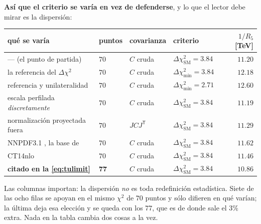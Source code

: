 \documentclass[11pt,a4paper]{article}
\begin{document}
\noindent\textbf{Así que el criterio se varía en vez de defenderse}, y lo que el lector debe mirar
es la dispersión:
\begin{center}\small
{}
\begin{tabular}{llll r}
\toprule
\rowcolor{hdrblue!10}qué se varía & puntos & covarianza & criterio & $1/R_5$ [TeV]\\
\midrule
--- (el punto de partida) & $70$ & $C$ cruda & $\Delta\chi^2_{\mathrm{SM}}=3.84$ & $11.20$\\
la referencia del $\Delta\chi^2$ & $70$ & $C$ cruda & $\Delta\chi^2_{\min}=3.84$ & $12.18$\\
referencia y unilateralidad & $70$ & $C$ cruda & $\Delta\chi^2_{\min}=2.71$ & $12.60$\\
escala perfilada \emph{discretamente} & $70$ & $C$ cruda & $\Delta\chi^2_{\mathrm{SM}}=3.84$ & $11.19$\\
normalización proyectada fuera & $70$ & $JCJ^{\mathsf T}$ & $\Delta\chi^2_{\mathrm{SM}}=3.84$ & $11.29$\\
NNPDF3.1 \cite{NNPDF31}, la base de \cite{CMSangular} & $70$ & $C$ cruda & $\Delta\chi^2_{\mathrm{SM}}=3.84$ & $11.62$\\
CT14nlo \cite{CT14} & $70$ & $C$ cruda & $\Delta\chi^2_{\mathrm{SM}}=3.84$ & $11.46$\\
\midrule
\textbf{citado en la \eqref{eq:tulimit}} & $\mathbf{77}$ & $C$ cruda & $\Delta\chi^2_{\mathrm{SM}}=3.84$ & $\mathbf{10.86}$\\
\bottomrule
\end{tabular}
\end{center}
\noindent Las columnas importan: la dispersión \emph{no} es toda redefinición estadística. Siete de
las ocho filas se apoyan en el mismo $\chi^2$ de $70$ puntos y sólo difieren en qué varían; la
última deja esa elección y se queda con los $77$, que es de donde sale el $3\%$ extra. Nada en la
tabla cambia dos cosas a la vez.
\end{document}
